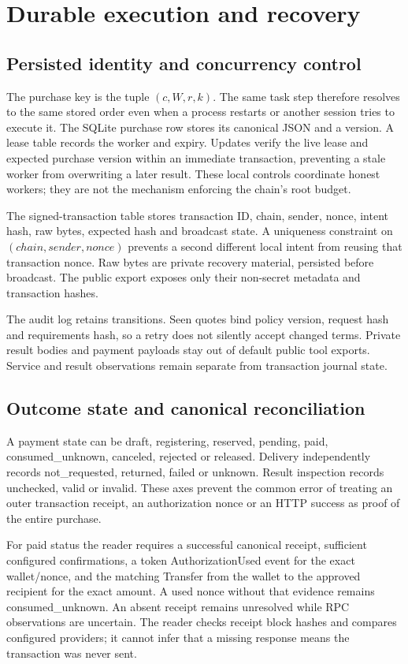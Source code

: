 \section{Durable execution and recovery}\label{sec:runtime}
\subsection{Persisted identity and concurrency control}
The purchase key is the tuple $(c,W,r,k)$. The same task step therefore resolves to the same stored order even when a process restarts or another session tries to execute it. The SQLite purchase row stores its canonical JSON and a version. A lease table records the worker and expiry. Updates verify the live lease and expected purchase version within an immediate transaction, preventing a stale worker from overwriting a later result. These local controls coordinate honest workers; they are not the mechanism enforcing the chain's root budget.

The signed-transaction table stores transaction ID, chain, sender, nonce, intent hash, raw bytes, expected hash and broadcast state. A uniqueness constraint on $(chain,sender,nonce)$ prevents a second different local intent from reusing that transaction nonce. Raw bytes are private recovery material, persisted before broadcast. The public export exposes only their non-secret metadata and transaction hashes.

The audit log retains transitions. Seen quotes bind policy version, request hash and requirements hash, so a retry does not silently accept changed terms. Private result bodies and payment payloads stay out of default public tool exports. Service and result observations remain separate from transaction journal state.

\subsection{Outcome state and canonical reconciliation}

A payment state can be draft, registering, reserved, pending, paid, consumed\_unknown, canceled, rejected or released. Delivery independently records not\_requested, returned, failed or unknown. Result inspection records unchecked, valid or invalid. These axes prevent the common error of treating an outer transaction receipt, an authorization nonce or an HTTP success as proof of the entire purchase.

For paid status the reader requires a successful canonical receipt, sufficient configured confirmations, a token AuthorizationUsed event for the exact wallet/nonce, and the matching Transfer from the wallet to the approved recipient for the exact amount. A used nonce without that evidence remains consumed\_unknown. An absent receipt remains unresolved while RPC observations are uncertain. The reader checks receipt block hashes and compares configured providers; it cannot infer that a missing response means the transaction was never sent.

